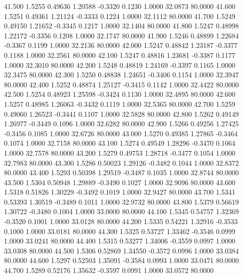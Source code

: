   41.500   1.5255   0.49636   1.20588  -0.3320   0.1230   1.0000  32.0873  80.0000
  41.600   1.5251   0.49361   1.21124  -0.3333   0.1224   1.0000  32.1112  80.0000
  41.700   1.5249   0.49150   1.21652  -0.3345   0.1217   1.0000  32.1404  80.0000
  41.800   1.5247   0.48998   1.22172  -0.3356   0.1208   1.0000  32.1747  80.0000
  41.900   1.5246   0.48899   1.22684  -0.3367   0.1199   1.0000  32.2136  80.0000
  42.000   1.5247   0.48842   1.23187  -0.3377   0.1188   1.0000  32.2561  80.0000
  42.100   1.5247   0.48816   1.23681  -0.3387   0.1177   1.0000  32.3010  80.0000
  42.200   1.5248   0.48819   1.24169  -0.3397   0.1165   1.0000  32.3475  80.0000
  42.300   1.5250   0.48838   1.24651  -0.3406   0.1154   1.0000  32.3947  80.0000
  42.400   1.5252   0.48874   1.25127  -0.3415   0.1142   1.0000  32.4422  80.0000
  42.500   1.5254   0.48923   1.25598  -0.3424   0.1130   1.0000  32.4895  80.0000
  42.600   1.5257   0.48985   1.26063  -0.3432   0.1119   1.0000  32.5365  80.0000
  42.700   1.5259   0.49060   1.26523  -0.3441   0.1107   1.0000  32.5828  80.0000
  42.800   1.5262   0.49149   1.26977  -0.3449   0.1096   1.0000  32.6282  80.0000
  42.900   1.5266   0.49256   1.27425  -0.3456   0.1085   1.0000  32.6726  80.0000
  43.000   1.5270   0.49385   1.27865  -0.3464   0.1074   1.0000  32.7158  80.0000
  43.100   1.5274   0.49549   1.28296  -0.3470   0.1064   1.0000  32.7578  80.0000
  43.200   1.5279   0.49753   1.28718  -0.3477   0.1054   1.0000  32.7983  80.0000
  43.300   1.5286   0.50023   1.29126  -0.3482   0.1044   1.0000  32.8372  80.0000
  43.400   1.5293   0.50398   1.29519  -0.3487   0.1035   1.0000  32.8744  80.0000
  43.500   1.5304   0.50948   1.29889  -0.3490   0.1027   1.0000  32.9096  80.0000
  43.600   1.5318   0.51826   1.30229  -0.3492   0.1019   1.0000  32.9427  80.0000
  43.700   1.5341   0.53393   1.30519  -0.3489   0.1011   1.0000  32.9732  80.0000
  43.800   1.5379   0.56619   1.30722  -0.3480   0.1004   1.0000  33.0000  80.0000
  44.100   1.5345   0.54757   1.32369  -0.3520   0.1001   1.0000  33.0128  80.0000
  44.200   1.5335   0.54221   1.32916  -0.3533   0.1000   1.0000  33.0181  80.0000
  44.300   1.5325   0.53727   1.33462  -0.3546   0.0999   1.0000  33.0241  80.0000
  44.400   1.5315   0.53277   1.34006  -0.3559   0.0997   1.0000  33.0308  80.0000
  44.500   1.5306   0.52869   1.34550  -0.3572   0.0996   1.0000  33.0384  80.0000
  44.600   1.5297   0.52503   1.35091  -0.3584   0.0993   1.0000  33.0471  80.0000
  44.700   1.5289   0.52176   1.35632  -0.3597   0.0991   1.0000  33.0572  80.0000

